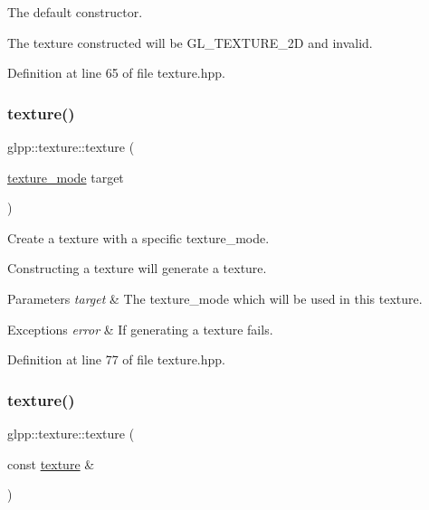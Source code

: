 The default constructor. 

The texture constructed will be G\+L\+\_\+\+T\+E\+X\+T\+U\+R\+E\+\_\+2D and invalid. 

Definition at line 65 of file texture.\+hpp.

\mbox{\label{classglpp_1_1texture_ae064901a9618b1f58f160cb3f587b4ce}} 
\subsubsection{\texorpdfstring{texture()}{texture()}\hspace{0.1cm}{\footnotesize\ttfamily [2/4]}}
{\footnotesize\ttfamily glpp\+::texture\+::texture (\begin{DoxyParamCaption}\item[{\hyperlink{namespaceglpp_a09dd2630cf15f1c3f3b4164c59cc7d26}{texture\+\_\+mode}}]{target }\end{DoxyParamCaption})\hspace{0.3cm}{\ttfamily [inline]}}



Create a texture with a specific texture\+\_\+mode. 

Constructing a texture will generate a texture.


\begin{DoxyParams}{Parameters}
{\em target} & The texture\+\_\+mode which will be used in this texture. \\
\hline
\end{DoxyParams}

\begin{DoxyExceptions}{Exceptions}
{\em error} & If generating a texture fails. \\
\hline
\end{DoxyExceptions}


Definition at line 77 of file texture.\+hpp.

\mbox{\label{classglpp_1_1texture_a8cd0e24fd6db7a32c0bd1ff5228fd2b7}} 
\subsubsection{\texorpdfstring{texture()}{texture()}\hspace{0.1cm}{\footnotesize\ttfamily [3/4]}}
{\footnotesize\ttfamily glpp\+::texture\+::texture (\begin{DoxyParamCaption}\item[{const \hyperlink{classglpp_1_1texture}{texture} \&}]{ }\end{DoxyParamCaption})\hspace{0.3cm}{\ttfamily [delete]}}


